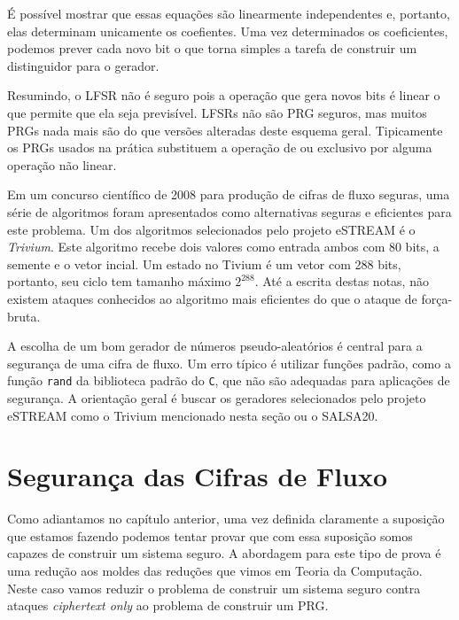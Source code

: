 É possível mostrar que essas equações são linearmente independentes e, portanto, elas determinam unicamente os coefientes.
Uma vez determinados os coeficientes, podemos prever cada novo bit o que torna simples a tarefa de construir um distinguidor para o gerador.

Resumindo, o LFSR não é seguro pois a operação que gera novos bits é linear o que permite que ela seja previsível.
LFSRs não são PRG seguros, mas muitos PRGs nada mais são do que versões alteradas deste esquema geral.
Tipicamente os PRGs usados na prática substituem a operação de ou exclusivo por alguma operação não linear.

Em um concurso científico de 2008 para produção de cifras de fluxo seguras, uma série de algoritmos foram apresentados como alternativas seguras e eficientes para este problema.
Um dos algoritmos selecionados pelo projeto eSTREAM é o {\em Trivium}.
Este algoritmo recebe dois valores como entrada ambos com 80 bits, a semente e o vetor incial.
Um estado no Tivium é um vetor com 288 bits, portanto, seu ciclo tem tamanho máximo $2^{288}$.
Até a escrita destas notas, não existem ataques conhecidos ao algoritmo mais eficientes do que o ataque de força-bruta.

A escolha de um bom gerador de números pseudo-aleatórios é central para a segurança de uma cifra de fluxo.
Um erro típico é utilizar funções padrão, como a função {\tt rand} da biblioteca padrão do {\tt C}, que não são adequadas para aplicações de segurança.
A orientação geral é buscar os geradores selecionados pelo projeto eSTREAM como o Trivium mencionado nesta seção ou o SALSA20.

\section{Segurança das Cifras de Fluxo}
\label{sec:streamcipher-sec}

Como adiantamos no capítulo anterior, uma vez definida claramente a suposição que estamos fazendo podemos tentar provar que com essa suposição somos capazes de construir um sistema seguro.
A abordagem para este tipo de prova é uma redução aos moldes das reduções que vimos em Teoria da Computação.
Neste caso vamos reduzir o problema de construir um sistema seguro contra ataques {\em ciphertext only} ao problema de construir um PRG.


